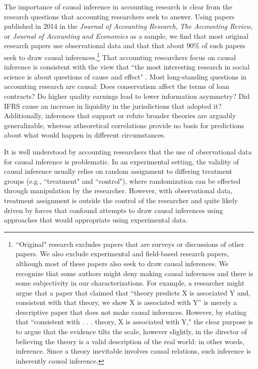 \documentclass[11pt]{amsart}
\begin{document}
The importance of causal inference in accounting research is clear from the research questions that accounting researchers seek to answer. Using papers published in 2014 in the \textit{Journal of Accounting Research}, \textit{The Accounting Review}, or \textit{Journal of Accounting and Economics} as a sample, we find that most original research papers use observational data and that that about 90\% of such papers seek to draw causal inferences.\footnote{
 ``Original" research excludes papers that are surveys or discussions of other papers.
We also exclude experimental and field-based research papers, although most of these papers also seek to draw causal inferences. 
We recognize that some authors might deny making causal inferences and there is some subjectivity in our characterizations.
For example, a researcher might argue that a paper that claimed that ``theory predicts X is associated Y and, consistent with that theory, we show X is associated with Y'' is merely a descriptive paper that does not make causal inferences.
However, by stating that ``consistent with . . . theory, X is associated with Y," the clear purpose is to argue that the
evidence tilts the scale, however slightly, in the director of believing the theory is a valid description of the real world: in other words, inference.
Since a theory inevitable involves causal relations, such inference is inherently causal inference.}
That accounting researchers focus on causal inference is consistent with the view that ``the most interesting research in social science is about questions of cause and effect" \cite[p. 3]{Angrist:2008vk}.
Most long-standing questions in accounting research are causal: 
Does conservatism affect the terms of loan contracts?
Do higher quality earnings lead to lower information asymmetry? 
Did IFRS cause an increase in liquidity in the jurisdictions that adopted it?
Additionally, inferences that support or refute broader theories are arguably generalizable, whereas atheoretical correlations provide no basis for predictions about what would happen in different circumstances.

It is well understood by accounting researchers that the use of observational data for causal inference is problematic.
In an experimental setting, the validity of causal inference usually relies on random assignment to differing treatment groups (e.g., ``treatment" and ``control"), where randomization can be effected through manipulation by the researcher. %
However, with observational data, treatment assignment is outside the control of the researcher and quite likely driven by forces that confound attempts to draw causal inferences using approaches that would appropriate using experimental data.
\end{document}
